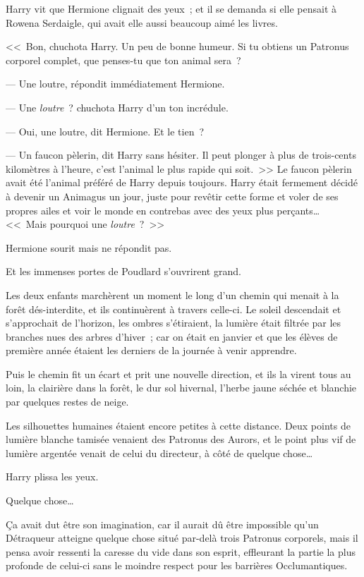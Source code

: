 Harry vit que Hermione clignait des yeux~; et il se demanda si elle pensait à Rowena Serdaigle, qui avait elle aussi beaucoup aimé les livres.

<<~Bon, chuchota Harry. Un peu de bonne humeur. Si tu obtiens un Patronus corporel complet, que penses-tu que ton animal sera~?

--- Une loutre, répondit immédiatement Hermione.

--- Une \emph{loutre}~? chuchota Harry d'un ton incrédule.

--- Oui, une loutre, dit Hermione. Et le tien~?

--- Un faucon pèlerin, dit Harry sans hésiter. Il peut plonger à plus de trois-cents kilomètres à l'heure, c'est l'animal le plus rapide qui soit.~>> Le faucon pèlerin avait été l'animal préféré de Harry depuis toujours. Harry était fermement décidé à devenir un Animagus un jour, juste pour revêtir cette forme et voler de ses propres ailes et voir le monde en contrebas avec des yeux plus perçants… <<~Mais pourquoi une \emph{loutre}~?~>>

Hermione sourit mais ne répondit pas.

Et les immenses portes de Poudlard s'ouvrirent grand.

Les deux enfants marchèrent un moment le long d'un chemin qui menait à la forêt dés-interdite, et ils continuèrent à travers celle-ci. Le soleil descendait et s'approchait de l'horizon, les ombres s'étiraient, la lumière était filtrée par les branches nues des arbres d'hiver~; car on était en janvier et que les élèves de première année étaient les derniers de la journée à venir apprendre.

Puis le chemin fit un écart et prit une nouvelle direction, et ils la virent tous au loin, la clairière dans la forêt, le dur sol hivernal, l'herbe jaune séchée et blanchie par quelques restes de neige.

Les silhouettes humaines étaient encore petites à cette distance. Deux points de lumière blanche tamisée venaient des Patronus des Aurors, et le point plus vif de lumière argentée venait de celui du directeur, à côté de quelque chose…

Harry plissa les yeux.

Quelque chose…

Ça avait dut être son imagination, car il aurait dû être impossible qu'un Détraqueur atteigne quelque chose situé par-delà trois Patronus corporels, mais il pensa avoir ressenti la caresse du vide dans son esprit, effleurant la partie la plus profonde de celui-ci sans le moindre respect pour les barrières Occlumantiques.

